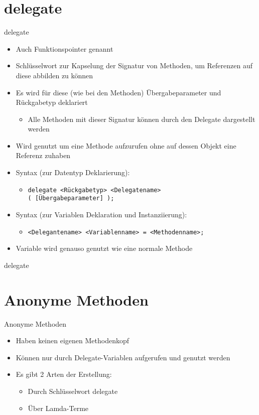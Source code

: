 \section{delegate}
\begin{frame}{delegate}
	\begin{itemize}
		\item Auch Funktionspointer genannt
		\item Schlüsselwort zur Kapselung der Signatur von Methoden, um Referenzen auf diese abbilden zu können
		\item Es wird für diese (wie bei den Methoden) Übergabeparameter und Rückgabetyp deklariert
			\begin{itemize}
				\item Alle Methoden mit dieser Signatur können durch den Delegate dargestellt werden
			\end{itemize}
		\item Wird genutzt um eine Methode aufzurufen ohne auf dessen Objekt eine Referenz zuhaben
		\item Syntax (zur Datentyp Deklarierung):
		\begin{itemize}
			\item \texttt{delegate \alert{<Rückgabetyp> <Delegatename>}\\( \alert{[Übergabeparameter]} );}
		\end{itemize}
		\item Syntax (zur Variablen Deklaration und Instanziierung):
		\begin{itemize}
			\item \texttt{\alert{<Delegantename> <Variablenname>} = \alert{<Methodenname>};}
		\end{itemize}
		\item Variable wird genauso genutzt wie eine normale Methode
	\end{itemize}
\end{frame}

\begin{frame}{delegate}
	
	
\end{frame}

\section{Anonyme Methoden}
\begin{frame}{Anonyme Methoden}
	\begin{itemize}
		\item Haben keinen eigenen Methodenkopf
		\item Können nur durch Delegate-Variablen aufgerufen und genutzt werden
		\item Es gibt 2 Arten der Erstellung:
		\begin{itemize}
			\item Durch Schlüsselwort \alert{delegate}
			\item Über Lamda-Terme
		\end{itemize}	
	\end{itemize}
\end{frame}

